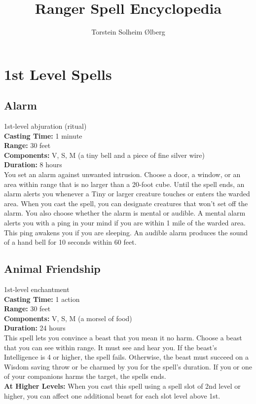 \documentclass[11pt, A4paper, english]{article}
\author{Torstein Solheim Ølberg}
\title{Ranger Spell Encyclopedia}
\begin{document}
\maketitle

\tableofcontents




	\section{1st Level Spells}
		\subsection{Alarm}
1st-level abjuration (ritual) \\
\textbf{Casting Time:} 1 minute \\
\textbf{Range:} 30 feet \\
\textbf{Components:} V, S, M (a tiny bell and a piece of fine silver wire) \\
\textbf{Duration:} 8 hours \\
You set an alarm against unwanted intrusion. Choose a door, a window, or an area within range that is no larger than a 20-foot cube. Until the spell ends, an alarm alerts you whenever a Tiny or larger creature touches or enters the warded area. When you cast the spell, you can designate creatures that won’t set off the alarm. You also choose whether the alarm is mental or audible. A mental alarm alerts you with a ping in your mind if you are within 1 mile of the warded area. This ping awakens you if you are sleeping. An audible alarm produces the sound of a hand bell for 10 seconds within 60 feet.

		\subsection{Animal Friendship}
1st-level enchantment \\
\textbf{Casting Time:} 1 action \\
\textbf{Range:} 30 feet \\
\textbf{Components:} V, S, M (a morsel of food) \\
\textbf{Duration:} 24 hours \\
This spell lets you convince a beast that you mean it no harm. Choose a beast that you can see within range. It must see and hear you. If the beast’s Intelligence is 4 or higher, the spell fails. Otherwise, the beast must succeed on a Wisdom saving throw or be charmed by you for the spell’s duration. If you or one of your companions harms the target, the spells ends. \\
\textbf{At Higher Levels:} When you cast this spell using a spell slot of 2nd level or higher, you can affect one additional beast for each slot level above 1st.
\end{document}
